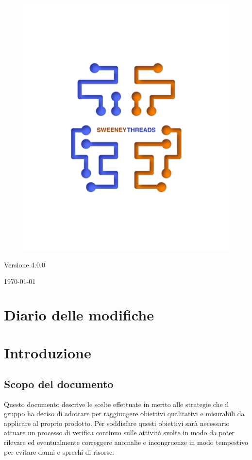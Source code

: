 \documentclass[a4paper]{article}
\begin{document}
\begin{titlepage}
		\begin{figure}[H]
			\centering
			\includegraphics[scale=0.8]{sweeney.png}
		\end{figure}
		\begin{center}
			Versione 4.0.0
		\end{center}
		{\large \today}\\[3cm] 
		\vfill  
	\end{titlepage}
	
	\tableofcontents
	\newpage
	\section*{Diario delle modifiche}
     
	\newpage
    \section{Introduzione}
		\subsection{Scopo del documento}
			Questo documento descrive le scelte effettuate in merito alle strategie 
			che il gruppo ha deciso di adottare per raggiungere obiettivi qualitativi e misurabili da 
			applicare al proprio prodotto. Per soddisfare questi obiettivi sarà necessario attuare un 
			processo di verifica continuo sulle attività svolte in modo da poter rilevare ed eventualmente 
			correggere anomalie e incongruenze in modo tempestivo per evitare danni e sprechi di risorse.
\end{document}
